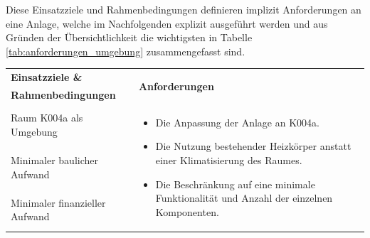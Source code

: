 Diese Einsatzziele und Rahmenbedingungen definieren implizit Anforderungen an eine Anlage, welche im Nachfolgenden explizit ausgeführt werden und aus Gründen der Übersichtlichkeit die wichtigsten in Tabelle \ref{tab:anforderungen_umgebung} zusammengefasst sind.


\begin{table}[H]
\centering
\small
\renewcommand{\arraystretch}{1.3}
\begin{tabularx}{1\textwidth}{m{}m{}}

\toprule

\textbf{Einsatzziele \&} & \multirow{2}{\hsize}{\textbf{Anforderungen}} \\ 
\textbf{Rahmenbedingungen} & \\

\cmidrule[0.5pt](r{0.25em}){1-1} 
\cmidrule[0.5pt](l{0.25em}){2-2}

Raum K004a als Umgebung  & \multirow{3}{\hsize}{
\begin{minipage}[t]{0.57\textwidth}
\begin{itemize}[itemsep=0pt,topsep=0pt,leftmargin=5mm]
	\item Die Anpassung der Anlage an K004a.
	\item Die Nutzung bestehender Heizkörper anstatt einer Klimatisierung des Raumes. 
	\item Die Beschränkung auf eine minimale Funktionalität und Anzahl der einzelnen Komponenten. 
\end{itemize}
\end{minipage}
}
 \\
	
\cmidrule[0.1pt](lr{2em}){1-1} 
Minimaler baulicher Aufwand & \\

\cmidrule[0.1pt](lr{2em}){1-1} 
Minimaler finanzieller \newline Aufwand &\\ 

\cmidrule[0.5pt](r{0.25em}){1-1} 
\cmidrule[0.5pt](l{0.25em}){2-2}


\end{tabularx}
\end{table}

